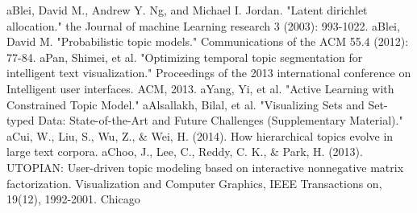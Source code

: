 \documentclass[10pt,journal,compsoc]{IEEEtran}
\begin{document}
\begin{thebibliography}{1}
\bibitem aBlei, David M., Andrew Y. Ng, and Michael I. Jordan. "Latent dirichlet allocation." the Journal of machine Learning research 3 (2003): 993-1022.
\bibitem aBlei, David M. "Probabilistic topic models." Communications of the ACM 55.4 (2012): 77-84.
\bibitem aPan, Shimei, et al. "Optimizing temporal topic segmentation for intelligent text visualization." Proceedings of the 2013 international conference on Intelligent user interfaces. ACM, 2013.
\bibitem aYang, Yi, et al. "Active Learning with Constrained Topic Model."
\bibitem aAlsallakh, Bilal, et al. "Visualizing Sets and Set-typed Data: State-of-the-Art and Future Challenges (Supplementary Material)."
\bibitem aCui, W., Liu, S., Wu, Z., \& Wei, H. (2014). How hierarchical topics evolve in large text corpora.
\bibitem aChoo, J., Lee, C., Reddy, C. K., \& Park, H. (2013). UTOPIAN: User-driven topic modeling based on interactive nonnegative matrix factorization. Visualization and Computer Graphics, IEEE Transactions on, 19(12), 1992-2001.
Chicago	

\end{thebibliography}

% 






\end{document}
